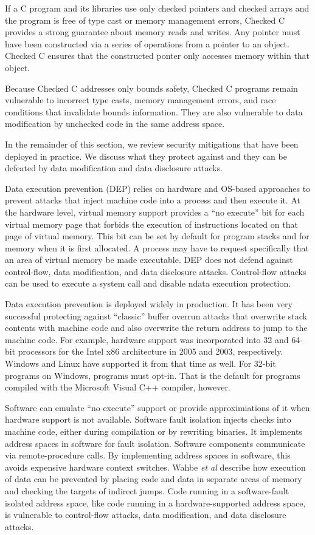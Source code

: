 If a C program and its libraries use only checked pointers and checked arrays and 
the program is free of type 
cast or memory management errors, Checked C provides a strong
guarantee about memory reads and writes. Any pointer must have been constructed
via a  series of operations from a pointer to an object.   Checked C ensures 
that the constructed ponter only accesses memory within that object.  

Because Checked C addresses only bounds safety, Checked C programs 
remain vulnerable  to incorrect type casts, memory management errors, 
and race conditions that invalidate bounds information. They are also
vulnerable to data modification by unchecked code in the same address space.

In the remainder of this section, we review security mitigations that
have been deployed in practice. We discuss what they protect against
and they can be defeated by data modification and data disclosure attacks.

Data execution prevention (DEP) relies on hardware and OS-based approaches
to prevent attacks that inject machine code into a process and then
execute it.   At the hardware level, virtual memory support provides
a ``no execute'' bit for each virtual memory page that forbids the execution
of instructions located on that page of virtual memory.  This bit can be set by
default for program stacks and for memory when it is first allocated. A process
may have to request specifically that an area of virtual memory be made
executable.  
DEP does not defend against control-flow,  data modification, and data disclosure
attacks.  Control-flow attacks can be used to execute a system call and disable 
ndata execution protection.    

Data execution prevention is deployed widely in production.  It has been very
successful protecting against ``classic'' buffer overrun attacks that overwrite 
stack contents with machine code and also overwrite the return address to jump to 
the machine code.
For example, hardware support was incorporated into 32 and 64-bit processors
for the Intel x86 architecture in 2005 and 2003, respectively.  Windows
and Linux have supported it from that time as well.  For 32-bit programs on
Windows, programs must opt-in.  That is the default for programs compiled
with the Microsoft Visual C++ compiler, however.

Software can emulate ``no execute'' support or provide approximiations of it
when hardware support is not available. Software fault isolation
\cite{Castro2009, Erlingsson2006,McCamant2006,Wahbe1993,Yee2009} injects checks
into machine code, either during compilation or by rewriting binaries.
It implements address spaces in software for fault isolation. Software components communicate via remote-procedure calls. By implementing address
spaces in software, this avoids expensive hardware context switches.
Wahbe {\it et al} \cite{Wahbe1993} describe how execution of data can be
prevented by placing code and data in separate areas of memory and checking the
targets of  indirect jumps.  Code running in a software-fault isolated address
space, like code running in a hardware-supported address space, is vulnerable to 
control-flow attacks, data modification,  and data disclosure attacks.

